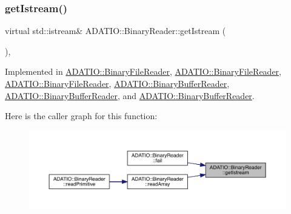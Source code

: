 \mbox{\label{classADATIO_1_1BinaryReader_aa34e73d5f1e6b2b3b48c27e97f6a85a0}} 
\subsubsection{\texorpdfstring{getIstream()}{getIstream()}\hspace{0.1cm}{\footnotesize\ttfamily [1/3]}}
{\footnotesize\ttfamily virtual std\+::istream\& A\+D\+A\+T\+I\+O\+::\+Binary\+Reader\+::get\+Istream (\begin{DoxyParamCaption}{ }\end{DoxyParamCaption})\hspace{0.3cm}{\ttfamily [protected]}, {}}



Implemented in \mbox{\hyperlink{classADATIO_1_1BinaryFileReader_ae0985a1157f9baa87580606cfcf98908}{A\+D\+A\+T\+I\+O\+::\+Binary\+File\+Reader}}, \mbox{\hyperlink{classADATIO_1_1BinaryFileReader_ae0985a1157f9baa87580606cfcf98908}{A\+D\+A\+T\+I\+O\+::\+Binary\+File\+Reader}}, \mbox{\hyperlink{classADATIO_1_1BinaryFileReader_ae0985a1157f9baa87580606cfcf98908}{A\+D\+A\+T\+I\+O\+::\+Binary\+File\+Reader}}, \mbox{\hyperlink{classADATIO_1_1BinaryBufferReader_a32d746446a4c990f3c592a32753d7207}{A\+D\+A\+T\+I\+O\+::\+Binary\+Buffer\+Reader}}, \mbox{\hyperlink{classADATIO_1_1BinaryBufferReader_a32d746446a4c990f3c592a32753d7207}{A\+D\+A\+T\+I\+O\+::\+Binary\+Buffer\+Reader}}, and \mbox{\hyperlink{classADATIO_1_1BinaryBufferReader_a32d746446a4c990f3c592a32753d7207}{A\+D\+A\+T\+I\+O\+::\+Binary\+Buffer\+Reader}}.

Here is the caller graph for this function\+:
\nopagebreak
\begin{figure}[H]
\begin{center}
\leavevmode
\includegraphics[width=350pt]{da/dd9/classADATIO_1_1BinaryReader_aa34e73d5f1e6b2b3b48c27e97f6a85a0_icgraph}
\end{center}
\end{figure}
\mbox{\label{classADATIO_1_1BinaryReader_aa34e73d5f1e6b2b3b48c27e97f6a85a0}} 
